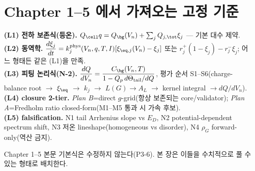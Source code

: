 \section{Chapter 1--5 에서 가져오는 고정 기준}\label{sec:ch6_inherit}
\begin{linkbox}
\textbf{(L1) 전하 보존식(등온).} $Q_\cell q=Q_\bg(V_n)+\sum_j Q_{j,\tot}\xi_j$ — 기본 대수 제약.\\
\textbf{(L2) 동역학.} $\dfrac{d\xi_j}{dt}=k_j^{\mathrm{phys}}(V_n,q,T,I)[\xi_{\eq,j}(V_n)-\xi_j]$ 또는
$r_j^+(1-\xi_j)-r_j^-\xi_j$; 어느 형태든 같은 (L1)을 만족.\\
\textbf{(L3) 피팅 논리식(N-2).} $\dfrac{dQ}{dV_n}=\dfrac{C_\bg(V_n,T)}{1-Q_p\,d\Theta_{\mathrm{tail}}/dQ}$,
평가 순서 S1--S6(charge-balance root $\to$ $\xi_{\eq}$ $\to$ $k_j$ $\to$ $L(G)\to A_L$ $\to$ kernel
integral $\to dQ/dV_n$).\\
\textbf{(L4) closure 2-tier.} \emph{Plan B}=direct $g$-grid(항상 보존되는 core/validator);
\emph{Plan A}=Fredholm ratio closed-form(M1--M5 통과 시 가속 후보).\\
\textbf{(L5) falsification.} N1 tail Arrhenius slope vs $E_D$, N2 potential-dependent spectrum shift,
N3 저온 lineshape(homogeneous vs disorder), N4 $\rho_G$ forward-only(역산 금지).
\end{linkbox}
Chapter 1--5 본문 기본식은 수정하지 않는다(P3-6). 본 장은 이들을 수치적으로 풀 수 있는 형태로 배치한다.

